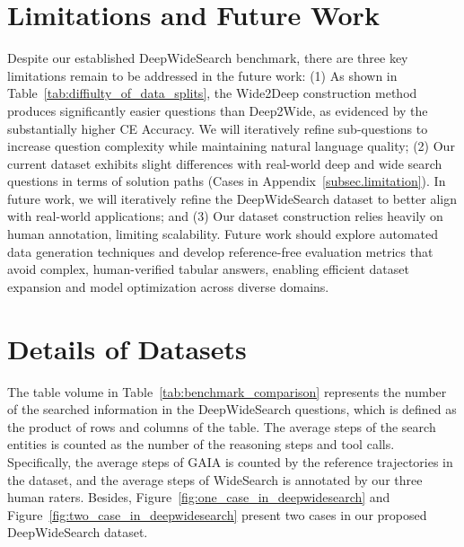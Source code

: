 \documentclass[11pt, letterpaper, logo, onecolumn, copyright, numbering]{paper_improved}
\begin{document}
\section{Limitations and Future Work}
Despite our established DeepWideSearch benchmark, there are three key limitations remain to be addressed in the future work:
(1) As shown in Table~\ref{tab:diffiulty_of_data_splits}, the Wide2Deep construction method produces significantly easier questions than Deep2Wide, as evidenced by the substantially higher CE Accuracy. We will iteratively refine sub-questions to increase question complexity while maintaining natural language quality;
(2) Our current dataset exhibits slight differences with real-world deep and wide search questions in terms of solution paths (Cases in Appendix~\ref{subsec.limitation}). In future work, we will iteratively refine the DeepWideSearch dataset to better align with real-world applications;
and (3) Our dataset construction relies heavily on human annotation, limiting scalability. Future work should explore automated data generation techniques and develop reference-free evaluation metrics that avoid complex, human-verified tabular answers, enabling efficient dataset expansion and model optimization across diverse domains.



\appendix %
% 

\clearpage
\newpage
% 
\section{Details of Datasets\label{subsec.data_stats}}
The table volume in Table~\ref{tab:benchmark_comparison} represents the number of the searched information in the DeepWideSearch questions, which is defined as the product of rows and columns of the table.
The average steps of the search entities is counted as the number of the reasoning steps and tool calls. Specifically, the average steps of GAIA is counted by the reference trajectories in the dataset, and the average steps of WideSearch is annotated by our three human raters.
Besides, Figure~\ref{fig:one_case_in_deepwidesearch} and Figure~\ref{fig:two_case_in_deepwidesearch} present two cases in our proposed DeepWideSearch dataset.
\end{document}
